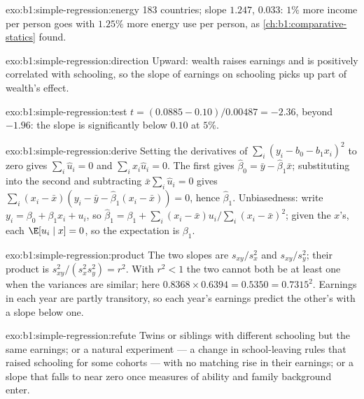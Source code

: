 \begin{solution}{exo:b1:simple-regression:energy}
183 countries; slope $1.247$,  $0.033$: $1\%$ more income per person goes
with $1.25\%$ more energy use per person, as \cref{ch:b1:comparative-statics} found.
\end{solution}

\begin{solution}{exo:b1:simple-regression:direction}
Upward: wealth raises earnings and is positively correlated with
schooling, so the slope of earnings on schooling picks up part of
wealth's effect.
\end{solution}

\begin{solution}{exo:b1:simple-regression:test}
$t = (0.0885 - 0.10)/0.00487 = -2.36$, beyond $-1.96$: the slope is significantly below
$0.10$ at $5\%$.
\end{solution}

\begin{solution}{exo:b1:simple-regression:derive}
Setting the derivatives of $\sum_i (y_i - b_0 - b_1x_i)^2$ to zero gives $\sum_i \hat u_i = 0$ and $\sum_i x_i\hat u_i = 0$.
The first gives $\hat\beta_0 = \bar y - \hat\beta_1\bar x$; substituting into the second and subtracting
$\bar x\sum_i \hat u_i = 0$ gives $\sum_i (x_i - \bar x)(y_i - \bar y - \hat\beta_1(x_i - \bar x)) = 0$, hence $\hat\beta_1$. Unbiasedness:
write $y_i = \beta_0 + \beta_1x_i + u_i$, so $\hat\beta_1 = \beta_1 + \sum_i (x_i - \bar x)u_i/\sum_i (x_i - \bar x)^2$; given the $x$'s, each
$\E[u_i \mid x] = 0$, so the expectation is $\beta_1$.
\end{solution}

\begin{solution}{exo:b1:simple-regression:product}
The two slopes are $s_{xy}/s_x^2$ and $s_{xy}/s_y^2$; their product is $s_{xy}^2/(s_x^2s_y^2) = r^2$. With $r^2 < 1$ the
two cannot both be at least one when the variances are similar; here
$0.8368 \times 0.6394 = 0.5350 = 0.7315^2$. Earnings in each year are partly transitory, so
each year's earnings predict the other's with a slope below one.
\end{solution}

\begin{solution}{exo:b1:simple-regression:refute}
Twins or siblings with different schooling but the same earnings; or a
natural experiment --- a change in school-leaving rules that raised schooling
for some cohorts --- with no matching rise in their earnings; or a slope that
falls to near zero once measures of ability and family background enter.
\end{solution}

